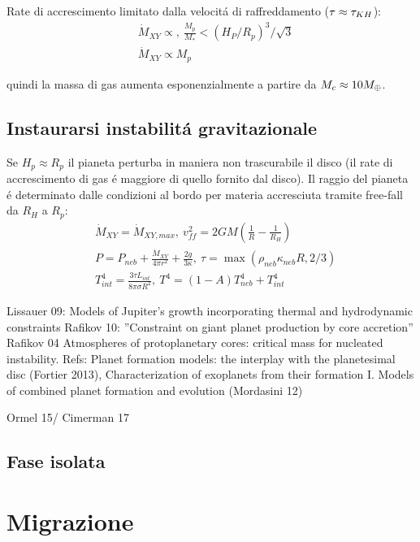 Rate di accrescimento limitato dalla velocit\'a di raffreddamento ($\tau\approx\tau_{KH}{}$):
\begin{align}
&\dot{M}_{XY}\propto,\ \frac{M_p}{M_*}<(H_P/R_p)^3/\sqrt{3}\\
&\dot{M}_{XY}\propto M_p
\end{align}

quindi la massa di gas aumenta esponenzialmente a partire da $M_c\approx10M_{\oplus}{}$.

\section{Instaurarsi instabilit\'a gravitazionale}

Se $H_p\approx R_p$ il pianeta perturba in maniera non trascurabile il disco (il rate di accrescimento di gas \'e maggiore di quello fornito dal disco). Il raggio del pianeta \'e determinato dalle condizioni al bordo per materia accresciuta tramite free-fall da $R_H$ a $R_p$:
\begin{align}
&\dot{M}_{XY}=\dot{M}_{XY,max},\ v_{ff}^2=2GM(\frac{1}{R}-\frac{1}{R_H})\\
&P=P_{neb}+\frac{\dot{M}_{XY}}{4\pi r^2}+\frac{2g}{3\kappa},\ \tau=\max{(\rho_{neb}\kappa_{neb}R,2/3)}\\
&T_{int}^4=\frac{3\tau L_{int}}{8\pi\sigma R^2},\ T^4=(1-A)T_{neb}^4+T_{int}^4
\end{align}


\begin{workout}
Lissauer 09: Models of Jupiter’s growth incorporating thermal and hydrodynamic constraints
Rafikov 10: ''Constraint on giant planet production by core accretion''
Rafikov 04 Atmospheres of protoplanetary cores: critical mass for nucleated instability.
Refs: Planet formation models: the interplay with the planetesimal disc (Fortier 2013), Characterization of exoplanets from their formation I. Models of combined planet formation and evolution (Mordasini 12)
\end{workout}

\begin{workout}
Ormel 15/ Cimerman 17
\end{workout}

\section{Fase isolata}

{\let\clearpage\relax\let\cleardoublepage\relax
\chapter{Migrazione}
}

